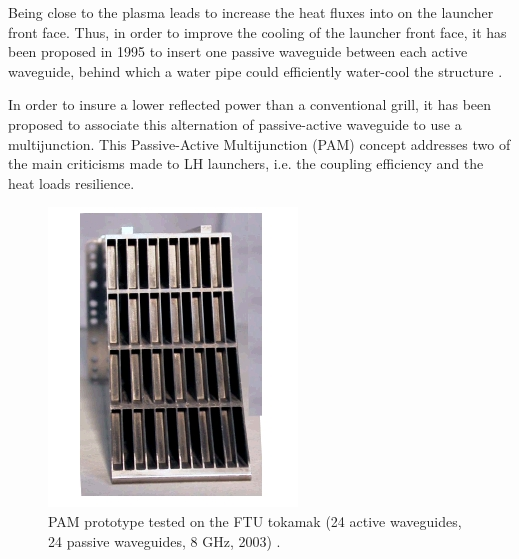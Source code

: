 Being close to the plasma leads to increase the heat fluxes into on the launcher front face. Thus, in order to improve the cooling of the launcher front face, it has been proposed in 1995 to insert one passive waveguide between each active waveguide, behind which a water pipe could efficiently water-cool the structure \parencite{Bibet1995}. 

In order to insure a lower reflected power than a conventional grill, it has been proposed to associate this alternation of passive-active waveguide to  use a multijunction. This Passive-Active Multijunction (PAM) concept addresses two of the main criticisms made to LH launchers, i.e. the coupling efficiency and the heat loads resilience. 



\begin{figure}
\centering
\includegraphics[width=0.4\linewidth]{Figures/LHCD/Pam_FTU}
\caption{PAM prototype tested on the FTU tokamak (24 active waveguides, 24 passive waveguides, 8 GHz, 2003) \parencite{Mirizzi2003, Ridolfini2005}.}
\label{fig:pamftu}
\end{figure}



